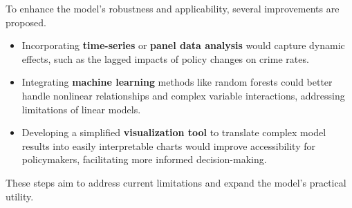 
To enhance the model's robustness and applicability, several improvements are proposed.
\begin{itemize}
    \item Incorporating \textbf{time-series} or \textbf{panel data analysis} would capture dynamic effects,
        such as the lagged impacts of policy changes on crime rates.
    \item Integrating \textbf{machine learning} methods like random forests
        could better handle nonlinear relationships and complex variable interactions,
        addressing limitations of linear models.
    \item Developing a simplified \textbf{visualization tool} to translate complex model results
        into easily interpretable charts would improve accessibility for policymakers,
        facilitating more informed decision-making.
\end{itemize}
These steps aim to address current limitations and expand the model's practical utility.
